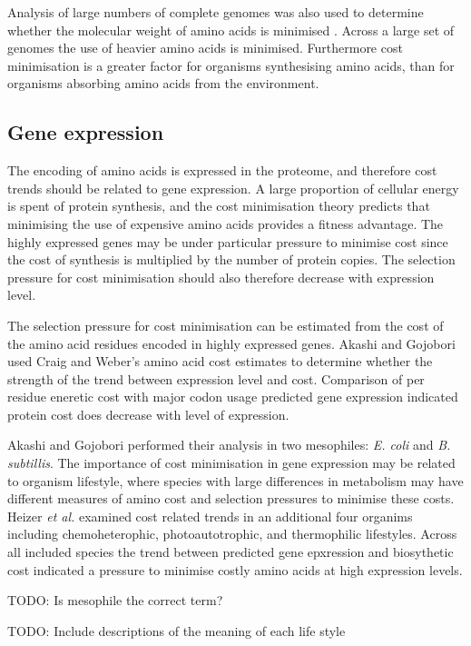 Analysis of large numbers of complete genomes was also used to determine whether the molecular weight of amino acids is minimised \cite{seligmann2003}. Across a large set of genomes the use of heavier amino acids is minimised. Furthermore cost minimisation is a greater factor for organisms synthesising amino acids, than for organisms absorbing amino acids from the environment.

\subsection{Gene expression}

The encoding of amino acids is expressed in the proteome, and therefore cost trends should be related to gene expression. A large proportion of cellular energy is spent of protein synthesis, and the cost minimisation theory predicts that minimising the use of expensive amino acids provides a fitness advantage. The highly expressed genes may be under particular pressure to minimise cost since the cost of synthesis is multiplied by the number of protein copies. The selection pressure for cost minimisation should also therefore decrease with expression level.

The selection pressure for cost minimisation can be estimated from the cost of the amino acid residues encoded in highly expressed genes. Akashi and Gojobori \cite{akashi2002} used Craig and Weber's amino acid cost estimates \cite{craig1998} to determine whether the strength of the trend between expression level and cost. Comparison of per residue eneretic cost with major codon usage predicted gene expression \cite{kanaya1999} indicated protein cost does decrease with level of expression.

Akashi and Gojobori performed their analysis in two mesophiles: \emph{E. coli} and \emph{B. subtillis}. The importance of cost minimisation in gene expression may be related to organism lifestyle, where species with large differences in metabolism may have different measures of amino cost and selection pressures to minimise these costs. Heizer \emph{et al.} \cite{heizer2006} examined cost related trends in an additional four organims including chemoheterophic, photoautotrophic, and thermophilic lifestyles. Across all included species the trend between predicted gene epxression and biosythetic cost indicated a pressure to minimise costly amino acids at high expression levels.

TODO: Is mesophile the correct term?

TODO: Include descriptions of the meaning of each life style

